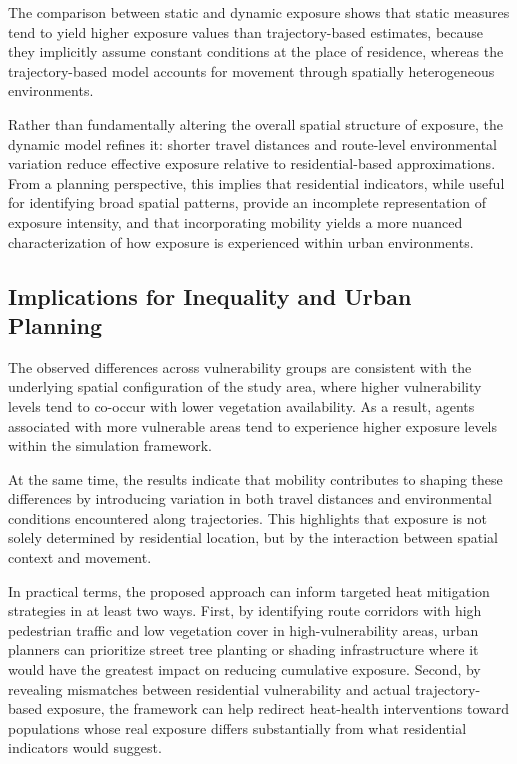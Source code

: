 \documentclass{wscpaperproc}
\theoremstyle{wsc}
\begin{document}
The comparison between static and dynamic exposure shows that static measures tend to yield higher exposure values than trajectory-based estimates, because they implicitly assume constant conditions at the place of residence, whereas the trajectory-based model accounts for movement through spatially heterogeneous environments.

Rather than fundamentally altering the overall spatial structure of exposure, the dynamic model refines it: shorter travel distances and route-level environmental variation reduce effective exposure relative to residential-based approximations. From a planning perspective, this implies that residential indicators, while useful for identifying broad spatial patterns, provide an incomplete representation of exposure intensity, and that incorporating mobility yields a more nuanced characterization of how exposure is experienced within urban environments.

\subsection{Implications for Inequality and Urban Planning}

The observed differences across vulnerability groups are consistent with the underlying spatial configuration of the study area, where higher vulnerability levels tend to co-occur with lower vegetation availability. As a result, agents associated with more vulnerable areas tend to experience higher exposure levels within the simulation framework.

At the same time, the results indicate that mobility contributes to shaping these differences by introducing variation in both travel distances and environmental conditions encountered along trajectories. This highlights that exposure is not solely determined by residential location, but by the interaction between spatial context and movement.

In practical terms, the proposed approach can inform targeted heat mitigation strategies in at least two ways. First, by identifying route corridors with high pedestrian traffic and low vegetation cover in high-vulnerability areas, urban planners can prioritize street tree planting or shading infrastructure where it would have the greatest impact on reducing cumulative exposure. Second, by revealing mismatches between residential vulnerability and actual trajectory-based exposure, the framework can help redirect heat-health interventions toward populations whose real exposure differs substantially from what residential indicators would suggest.
\end{document}
